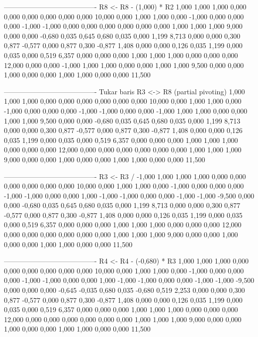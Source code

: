 \documentclass[12pt]{article}
\begin{document}
\begin{enumerate}
\begin{keluaran}
----------------------------------------
R8 <- R8 - (1,000) * R2
1,000   1,000   1,000   0,000   0,000   0,000   0,000   0,000   0,000   10,000
0,000   1,000   1,000   0,000   -1,000  0,000   0,000   0,000   -1,000  -1,000
0,000   0,000   0,000   0,000   0,000   0,000   1,000   1,000   1,000   9,000
0,000   0,000   -0,680  0,035   0,645   0,680   0,035   0,000   1,199   8,713
0,000   0,000   0,300   0,877   -0,577  0,000   0,877   0,300   -0,877  1,408
0,000   0,000   0,126   0,035   1,199   0,000   0,035   0,000   0,519   6,357
0,000   0,000   0,000   1,000   1,000   1,000   0,000   0,000   0,000   12,000
0,000   0,000   -1,000  1,000   1,000   0,000   0,000   1,000   1,000   9,500
0,000   0,000   1,000   0,000   0,000   1,000   1,000   0,000   0,000   11,500

----------------------------------------
Tukar baris R3 <-> R8 (partial pivoting)
1,000   1,000   1,000   0,000   0,000   0,000   0,000   0,000   0,000   10,000
0,000   1,000   1,000   0,000   -1,000  0,000   0,000   0,000   -1,000  -1,000
0,000   0,000   -1,000  1,000   1,000   0,000   0,000   1,000   1,000   9,500
0,000   0,000   -0,680  0,035   0,645   0,680   0,035   0,000   1,199   8,713
0,000   0,000   0,300   0,877   -0,577  0,000   0,877   0,300   -0,877  1,408
0,000   0,000   0,126   0,035   1,199   0,000   0,035   0,000   0,519   6,357
0,000   0,000   0,000   1,000   1,000   1,000   0,000   0,000   0,000   12,000
0,000   0,000   0,000   0,000   0,000   0,000   1,000   1,000   1,000   9,000
0,000   0,000   1,000   0,000   0,000   1,000   1,000   0,000   0,000   11,500

----------------------------------------
R3 <- R3 / -1,000
1,000   1,000   1,000   0,000   0,000   0,000   0,000   0,000   0,000   10,000
0,000   1,000   1,000   0,000   -1,000  0,000   0,000   0,000   -1,000  -1,000
0,000   0,000   1,000   -1,000  -1,000  0,000   0,000   -1,000  -1,000  -9,500
0,000   0,000   -0,680  0,035   0,645   0,680   0,035   0,000   1,199   8,713
0,000   0,000   0,300   0,877   -0,577  0,000   0,877   0,300   -0,877  1,408
0,000   0,000   0,126   0,035   1,199   0,000   0,035   0,000   0,519   6,357
0,000   0,000   0,000   1,000   1,000   1,000   0,000   0,000   0,000   12,000
0,000   0,000   0,000   0,000   0,000   0,000   1,000   1,000   1,000   9,000
0,000   0,000   1,000   0,000   0,000   1,000   1,000   0,000   0,000   11,500

----------------------------------------
R4 <- R4 - (-0,680) * R3
1,000   1,000   1,000   0,000   0,000   0,000   0,000   0,000   0,000   10,000
0,000   1,000   1,000   0,000   -1,000  0,000   0,000   0,000   -1,000  -1,000
0,000   0,000   1,000   -1,000  -1,000  0,000   0,000   -1,000  -1,000  -9,500
0,000   0,000   0,000   -0,645  -0,035  0,680   0,035   -0,680  0,519   2,253
0,000   0,000   0,300   0,877   -0,577  0,000   0,877   0,300   -0,877  1,408
0,000   0,000   0,126   0,035   1,199   0,000   0,035   0,000   0,519   6,357
0,000   0,000   0,000   1,000   1,000   1,000   0,000   0,000   0,000   12,000
0,000   0,000   0,000   0,000   0,000   0,000   1,000   1,000   1,000   9,000
0,000   0,000   1,000   0,000   0,000   1,000   1,000   0,000   0,000   11,500


\end{keluaran}
\end{enumerate}
\end{document}
